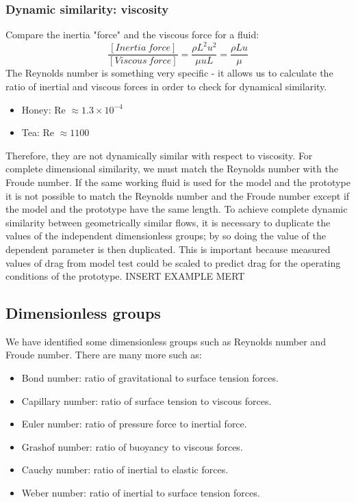 \subsubsection{Dynamic similarity: viscosity}
Compare the inertia "force" and the viscous force for a fluid:
\begin{equation}
  \frac{[Inertia \ force]}{[Viscous \ force]} = \frac{\rho L^2 u^2}{\mu u L} = \frac{\rho L u }{\mu}
\end{equation}
The Reynolds number is something very specific - it allows us to calculate the ratio of inertial and viscous forces in order to check for dynamical similarity.
\begin{itemize}[noitemsep]
  \item Honey: Re \(\approx 1.3 \times 10^{-4}\)
  \item Tea: Re \(\approx 1100 \)
\end{itemize}
Therefore, they are not dynamically similar with respect to viscosity.
For complete dimensional similarity, we must match the Reynolds number with the Froude number. If the same working fluid is used for the model and the prototype it is not possible to match the Reynolds number and the Froude number except if the model and the prototype have the same length. To achieve complete dynamic similarity between geometrically similar flows, it is necessary to duplicate the values of the independent dimensionless groups; by so doing the value of the dependent parameter is then duplicated. This is important because measured values of drag from model test could be scaled to predict drag for the operating conditions of the prototype. INSERT EXAMPLE MERT
\subsection{Dimensionless groups}
We have identified some dimensionless groups such as Reynolds number and Froude number. There are many more such as:
\begin{itemize}[noitemsep]
  \item Bond number: ratio of gravitational to surface tension forces.
  \item Capillary number: ratio of surface tension to viscous forces.
  \item Euler number: ratio of pressure force to inertial force.
  \item Grashof number: ratio of buoyancy to viscous forces.
  \item Cauchy number: ratio of inertial to elastic forces.
  \item Weber number: ratio of inertial to surface tension forces.
\end{itemize}
